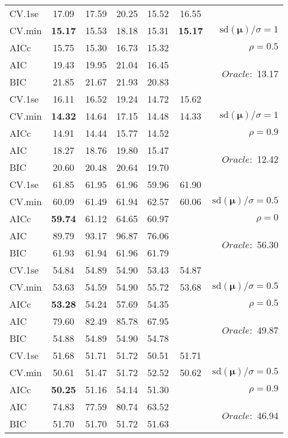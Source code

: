 \begin{table}
\begin{center}
\begin{tabular}{l*{5}{c}|r}
 \hline 
CV.1se & 17.09 & 17.59 & 20.25 & 15.52 & 16.55 & \\
CV.min & {\bf 15.17} & 15.53 & 18.18 & 15.31 & {\bf 15.17} &  $\mathrm{sd}(\mathbf{\mu})/\sigma=1$ \\
AICc & 15.75 & 15.30 & 16.73 & 15.32 & & $\rho=0.5$ \\
AIC & 19.43 & 19.95 & 21.04 & 16.45 & &  \multirow{2}{*}{$Oracle: $ 13.17} \\
BIC & 21.85 & 21.67 & 21.93 & 20.83 & &  \\
 \hline 
CV.1se & 16.11 & 16.52 & 19.24 & 14.72 & 15.62 & \\
CV.min & {\bf 14.32} & 14.64 & 17.15 & 14.48 & 14.33 &  $\mathrm{sd}(\mathbf{\mu})/\sigma=1$ \\
AICc & 14.91 & 14.44 & 15.77 & 14.52 & & $\rho=0.9$ \\
AIC & 18.27 & 18.76 & 19.80 & 15.47 & &  \multirow{2}{*}{$Oracle: $ 12.42} \\
BIC & 20.60 & 20.48 & 20.64 & 19.70 & &  \\
 \hline 
CV.1se & 61.85 & 61.95 & 61.96 & 59.96 & 61.90 & \\
CV.min & 60.09 & 61.49 & 61.94 & 62.57 & 60.06 &  $\mathrm{sd}(\mathbf{\mu})/\sigma=0.5$ \\
AICc & {\bf 59.74} & 61.12 & 64.65 & 60.97 & & $\rho=0$ \\
AIC & 89.79 & 93.17 & 96.87 & 76.06 & &  \multirow{2}{*}{$Oracle: $ 56.30} \\
BIC & 61.93 & 61.94 & 61.96 & 61.79 & &  \\
 \hline 
CV.1se & 54.84 & 54.89 & 54.90 & 53.43 & 54.87 & \\
CV.min & 53.63 & 54.59 & 54.90 & 55.72 & 53.68 &  $\mathrm{sd}(\mathbf{\mu})/\sigma=0.5$ \\
AICc & {\bf 53.28} & 54.24 & 57.69 & 54.35 & & $\rho=0.5$ \\
AIC & 79.60 & 82.49 & 85.78 & 67.95 & &  \multirow{2}{*}{$Oracle: $ 49.87} \\
BIC & 54.88 & 54.89 & 54.90 & 54.78 & &  \\
 \hline 
CV.1se & 51.68 & 51.71 & 51.72 & 50.51 & 51.71 & \\
CV.min & 50.61 & 51.47 & 51.72 & 52.52 & 50.62 &  $\mathrm{sd}(\mathbf{\mu})/\sigma=0.5$ \\
AICc & {\bf 50.25} & 51.16 & 54.14 & 51.30 & & $\rho=0.9$ \\
AIC & 74.83 & 77.59 & 80.74 & 63.52 & &  \multirow{2}{*}{$Oracle: $ 46.94} \\
BIC & 51.70 & 51.70 & 51.72 & 51.63 & &  \\
 \hline 
\end{tabular}
\end{center}
\vspace{-1cm}
\end{table}




